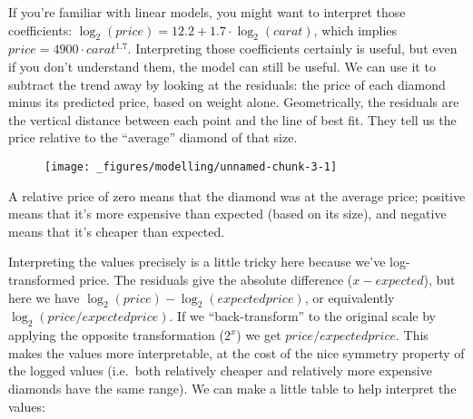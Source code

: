 \begin{Shaded}
\begin{Highlighting}[]
\StringTok{ }\StringTok{ } 
\NormalTok{(}
\end{Highlighting}
\end{Shaded}

If you're familiar with linear models, you might want to interpret those
coefficients: \(\log_2(price) = 12.2 + 1.7 \cdot \log_2(carat)\), which
implies \(price = 4900 \cdot carat ^ {1.7}\). Interpreting those
coefficients certainly is useful, but even if you don't understand them,
the model can still be useful. We can use it to subtract the trend away
by looking at the residuals: the price of each diamond minus its
predicted price, based on weight alone. Geometrically, the residuals are
the vertical distance between each point and the line of best fit. They
tell us the price relative to the ``average'' diamond of that size.

\begin{Shaded}
\end{Shaded}

\begin{figure}[H]
  \centering
  \texttt{[image: \_figures/modelling/unnamed-chunk-3-1]}
\end{figure}

A relative price of zero means that the diamond was at the average
price; positive means that it's more expensive than expected (based on
its size), and negative means that it's cheaper than expected.

Interpreting the values precisely is a little tricky here because we've
log-transformed price. The residuals give the absolute difference
(\(x - expected\)), but here we have
\(\log_2(price) - \log_2(expected price)\), or equivalently
\(\log_2(price / expected price)\). If we ``back-transform'' to the
original scale by applying the opposite transformation (\(2 ^ x\)) we
get \(price / expected price\). This makes the values more
interpretable, at the cost of the nice symmetry property of the logged
values (i.e.~both relatively cheaper and relatively more expensive
diamonds have the same range). We can make a little table to help
interpret the values:

